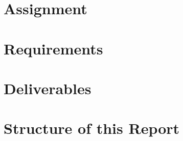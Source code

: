 \section{Assignment}



\section{Requirements}



\section{Deliverables}



\section{Structure of this Report}



